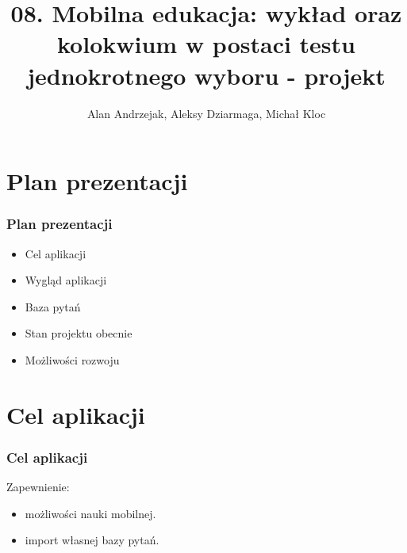 \documentclass[11pt]{beamer}
\author{Alan Andrzejak, Aleksy Dziarmaga, Michał Kloc}
\title{08. Mobilna edukacja: wykład oraz kolokwium w postaci testu jednokrotnego wyboru - projekt}
\date{}
\begin{document}
\begin{frame}
\titlepage
\end{frame}
\section{Plan prezentacji}
\begin{frame}
\frametitle{Plan prezentacji}\pause
\begin{itemize}
\item Cel aplikacji\pause
\item Wygląd aplikacji\pause
\item Baza pytań\pause
\item Stan projektu obecnie\pause
\item Możliwości rozwoju
\end{itemize}
\end{frame}
\section{Cel aplikacji}
\begin{frame}
\frametitle{Cel aplikacji}\pause
Zapewnienie:\\
\begin{itemize}
\item możliwości nauki mobilnej.\\\pause
\item import własnej bazy pytań.
\end{itemize}
\end{frame}
\end{document}
